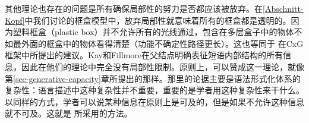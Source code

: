 其他理论也存在的问题是所有确保局部性的努力是否都应该被放弃。在\ref{Abschnitt-Kopf}中我们讨论的框盒模型中，放弃局部性就意味着所有的框盒都是透明的。因为塑料框盒（plastic box）并不允许所有的光线通过，包含在多层盒子中的物体不如最外面的框盒中的物体看得清楚（功能不确定性路径更长）。这也等同于 \citet{KF99a}在CxG\indexcxg 框架中所提出的建议。Kay和Fillmore在父结点明确表征短语内部结构的所有信息，因此在他们的理论中完全没有局部性限制。原则上，可以赞成这一理论，就像第\ref{sec-generative-capacity}章所提出的那样。那里的论据主要是语法形式化体系的复杂性：语言描述中这种复杂性并不重要，重要的是学者用这种复杂性来干什么。以同样的方式，学者可以说某种信息在原则上是可及的，但是如果不允许这种信息就不可及。这就是 \citet[--145]{ps}所采用的方法。

